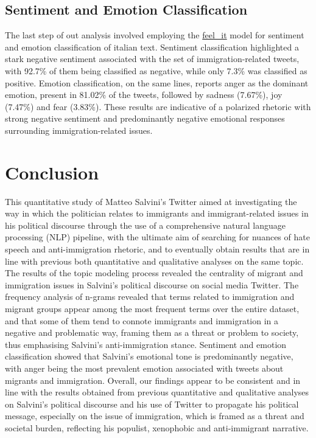 \documentclass[11pt]{article}
\begin{document}
\subsection{Sentiment and Emotion Classification}



The last step of out analysis involved employing the \href{https://github.com/MilaNLProc/feel-it}{feel\_it} model for sentiment and emotion classification of italian text.
Sentiment classification highlighted a stark negative sentiment associated with the set of immigration-related tweets, with 92.7\% of them being classified as negative, while only 7.3\% was classified as positive. Emotion classification, on the same lines, reports anger as the dominant emotion, present in 81.02\% of the tweets, followed by sadness (7.67\%), joy (7.47\%) and fear (3.83\%). These results are indicative of a polarized rhetoric with strong negative sentiment and predominantly negative emotional responses surrounding immigration-related issues.


\section{Conclusion}

This quantitative study of Matteo Salvini's Twitter aimed at investigating the way in which the politician relates to immigrants and immigrant-related issues in his political discourse through the use of a comprehensive natural language processing (NLP) pipeline, with the ultimate aim of searching for nuances of hate speech and anti-immigration rhetoric, and to eventually obtain results that are in line with previous both quantitative and qualitative analyses on the same topic.
The results of the topic modeling process revealed the centrality of migrant and immigration issues in Salvini's political discourse on social media Twitter.
The frequency analysis of n-grams revealed that terms related to immigration and migrant groups appear among the most frequent terms over the entire dataset, and that some of them tend to connote immigrants and immigration in a negative and problematic way, framing them as a threat or problem to society, thus emphasising Salvini's anti-immigration stance.
Sentiment and emotion classification  showed that Salvini's emotional tone is predominantly negative, with anger being the most prevalent emotion associated with tweets about migrants and immigration. Overall, our findings appear to be consistent and in line with the results obtained from previous quantitative and qualitative analyses on Salvini's political discourse and his use of Twitter to propagate his political message, especially on the issue of immigration, which is framed as a threat and societal burden, reflecting his populist, xenophobic and anti-immigrant narrative.
\end{document}
